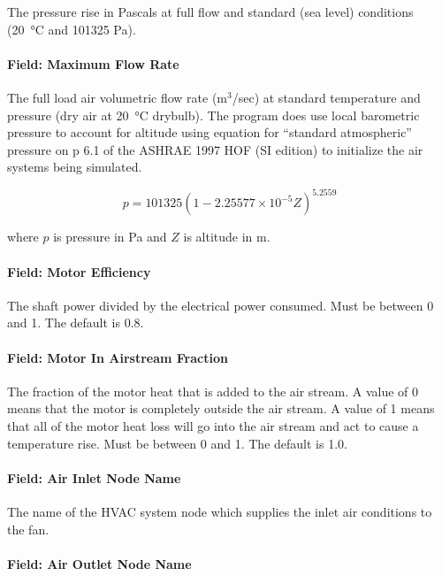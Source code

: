 The pressure rise in Pascals at full flow and standard (sea level) conditions (\SI{20}{\celsius} and 101325 Pa).

\paragraph{Field: Maximum Flow Rate}\label{field-maximum-flow-rate-1}

The full load air volumetric flow rate (m\(^{3}\)/sec) at standard temperature and pressure (dry air at \SI{20}{\celsius} drybulb). The program does use local barometric pressure to account for altitude using equation for ``standard atmospheric'' pressure on p 6.1 of the ASHRAE 1997 HOF (SI edition) to initialize the air systems being simulated.

\begin{equation}
p = 101325 \left(1 - 2.25577 \times 10^{-5} Z\right)^{5.2559}
\end{equation}

where \(p\) is pressure in Pa and \(Z\) is altitude in m.

\paragraph{Field: Motor Efficiency}\label{field-motor-efficiency-1}

The shaft power divided by the electrical power consumed. Must be between 0 and 1. The default is 0.8.

\paragraph{Field: Motor In Airstream Fraction}\label{field-motor-in-airstream-fraction-1}

The fraction of the motor heat that is added to the air stream. A value of 0 means that the motor is completely outside the air stream. A value of 1 means that all of the motor heat loss will go into the air stream and act to cause a temperature rise. Must be between 0 and 1. The default is 1.0.

\paragraph{Field: Air Inlet Node Name}\label{field-air-inlet-node-name-1-002}

The name of the HVAC system node which supplies the inlet air conditions to the fan.

\paragraph{Field: Air Outlet Node Name}\label{field-air-outlet-node-name-1-001}

